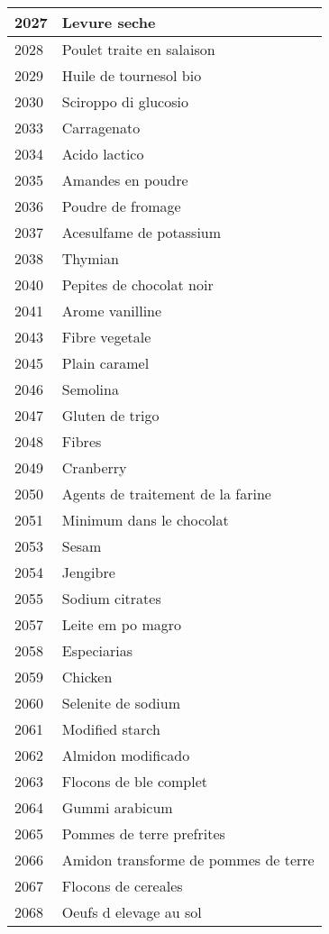 \begin{longtable}{|l|l|}
2027 & Levure seche \\ \hline 
2028 & Poulet traite en salaison \\ \hline 
2029 & Huile de tournesol bio \\ \hline 
2030 & Sciroppo di glucosio \\ \hline 
2033 & Carragenato \\ \hline 
2034 & Acido lactico \\ \hline 
2035 & Amandes en poudre \\ \hline 
2036 & Poudre de fromage \\ \hline 
2037 & Acesulfame de potassium \\ \hline 
2038 & Thymian \\ \hline 
2040 & Pepites de chocolat noir \\ \hline 
2041 & Arome vanilline \\ \hline 
2043 & Fibre vegetale \\ \hline 
2045 & Plain caramel \\ \hline 
2046 & Semolina \\ \hline 
2047 & Gluten de trigo \\ \hline 
2048 & Fibres \\ \hline 
2049 & Cranberry \\ \hline 
2050 & Agents de traitement de la farine \\ \hline 
2051 & Minimum dans le chocolat \\ \hline 
2053 & Sesam \\ \hline 
2054 & Jengibre \\ \hline 
2055 & Sodium citrates \\ \hline 
2057 & Leite em po magro \\ \hline 
2058 & Especiarias \\ \hline 
2059 & Chicken \\ \hline 
2060 & Selenite de sodium \\ \hline 
2061 & Modified starch \\ \hline 
2062 & Almidon modificado \\ \hline 
2063 & Flocons de ble complet \\ \hline 
2064 & Gummi arabicum \\ \hline 
2065 & Pommes de terre prefrites \\ \hline 
2066 & Amidon transforme de pommes de terre \\ \hline 
2067 & Flocons de cereales \\ \hline 
2068 & Oeufs d elevage au sol \\ \hline 

\end{longtable}
